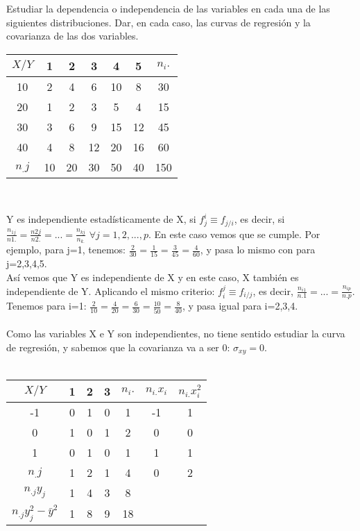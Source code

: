\problem
Estudiar la dependencia o independencia de las variables en cada una de las siguientes distribuciones. Dar, en cada caso, las curvas de regresión y la covarianza de las dos variables.

    \begin{center}
    \begin{tabular}{| c | c | c | c | c | c | c |}
        \hline
        $X / Y$ & 1 & 2 & 3 & 4 & 5 & $n_i.$\\ \hline
        10 & 2 & 4 & 6 & 10 & 8 & 30 \\
        20 & 1 & 2 & 3 & 5 & 4 & 15 \\
        30 & 3 & 6 & 9 & 15 & 12 & 45 \\
        40 & 4 & 8 & 12 & 20 & 16 & 60 \\
        $n_.j$ & 10 & 20 & 30 & 50 & 40 & 150 \\       \hline
    \end{tabular} \\ 
    \end{center}
    Y es independiente estadísticamente de X, si $f_j^i \equiv f_{j/i}$, es decir, si $\frac{n_{1j}}{n1.} = \frac{n2j}{n2.} = ... = \frac{n_{kj}}{n_{k.}}$ $ \forall j = 1,2,...,p $. En este caso vemos que se cumple. Por ejemplo, para j=1, tenemos: $\frac{2}{30} = \frac{1}{15} = \frac{3}{45} = \frac{4}{60}$, y pasa lo mismo con para j=2,3,4,5. \\
    Así vemos que Y es independiente de X y en este caso, X también es independiente de Y. Aplicando el mismo criterio: $f_i^j \equiv f_{i/j}$, es decir, $\frac{n_{i1}}{n.1} = ... = \frac{n_{ip}}{n.p}$. Tenemos para i=1: $\frac{2}{10} = \frac{4}{20} = \frac{6}{30} = \frac{10}{50} = \frac{8}{40}$, y pasa igual para i=2,3,4. \\ \\
    Como las variables X e Y son independientes, no tiene sentido estudiar la curva de regresión, y sabemos que la covarianza va a ser 0: $\sigma_{xy} = 0$. \\ \\
    \begin{center}
    \begin{tabular}{| c | c | c | c | c | c | c |}
        \hline
        $X / Y$ & 1 & 2 & 3 & $n_i.$ & $n_{i.}x_i$ & $n_{i.}x_i^2$\\ \hline
        -1 & 0 & 1 & 0 & 1 & -1 & 1 \\
        0 & 1 & 0 & 1 & 2 & 0 & 0 \\
        1 & 0 & 1 & 0 & 1 & 1 & 1 \\
        $n_.j$ & 1 & 2 & 1 & 4 & 0 & 2 \\
        $n_{.j}y_j$ & 1 & 4 & 3 & 8 & & \\
        $n_{.j}y_j^2 - \bar{y}^2$ & 1 & 8 & 9 & 18 & & \\
        \hline
    \end{tabular} \\ 
    \end{center}
